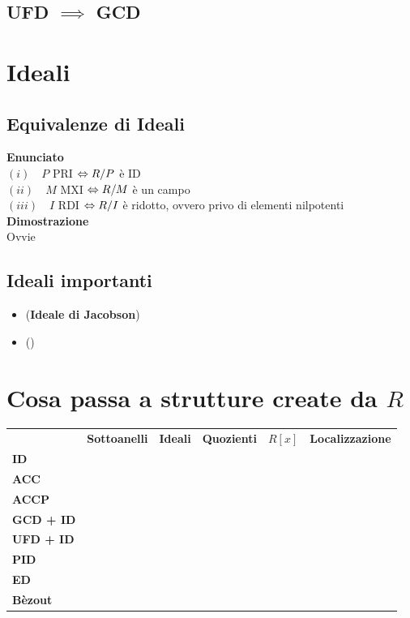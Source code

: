 \documentclass[a4paper,GeneralMath,NoNotes]{stdmdoc}
\newcommand{\Enunciato}{\vskip 0.05cm \noindent \textbf{Enunciato} \\ }
\renewcommand{\Dimostrazione}{\vskip 0.05cm \noindent \textbf{Dimostrazione} \\ }
\begin{document}
	\subsection{UFD $\implies$ GCD}

	\section*{Ideali}
	\subsection{Equivalenze di Ideali}
	\Enunciato
		$(i) \quad P $ PRI $\Leftrightarrow R/P$ è ID \\
		$(ii) \quad M $ MXI $\Leftrightarrow R/M$ è un campo \\
		$(iii) \quad I $ RDI $\Leftrightarrow R/I$ è ridotto, ovvero privo di elementi nilpotenti \\
	\Dimostrazione Ovvie

	\subsection{Ideali importanti}
	\begin{itemize}
		\item ({\bf Ideale di Jacobson})
		\item ({\bf })
	\end{itemize}

	\section*{Cosa passa a strutture create da $R$}
	\begin{tabular}{lccccc}
	 & {\bf Sottoanelli} & {\bf Ideali} & {\bf Quozienti} & {\bf $R[x]$} & {\bf Localizzazione} \\
	{\bf ID} & \checkmark & \checkmark & & \checkmark & \\
	{\bf ACC} & & & & \checkmark & \\
	{\bf ACCP} & & & & \checkmark & \\
	{\bf GCD + ID} & & & & \checkmark & \\
	{\bf UFD + ID} & & & & \checkmark & \\
	{\bf PID} & & & & \crossmark & \\
	{\bf ED} & & & & \crossmark & \\
	{\bf Bèzout} & & & & & \\
	
	\end{tabular} \vskip 1cm
\end{document}
